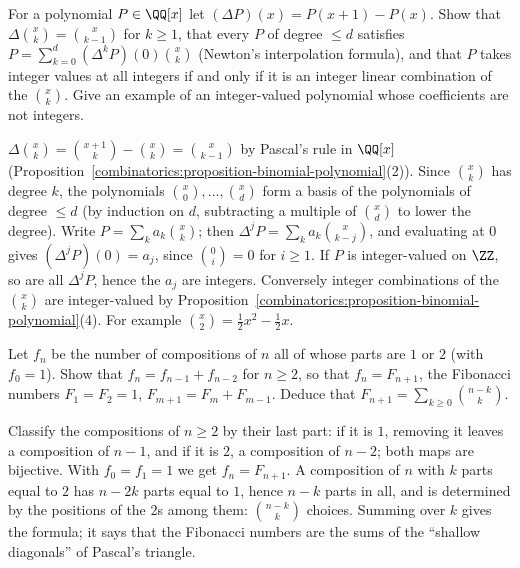 \begin{exercise}\label{combinatorics:exercise-integer-valued}
For a polynomial $P \in \QQ[x]$ let $(\Delta P)(x) = P(x + 1) - P(x)$. Show that $\Delta\binom{x}{k} = \binom{x}{k-1}$ for $k \geq 1$, that every $P$ of degree $\leq d$ satisfies
$P = \sum_{k=0}^{d}(\Delta^kP)(0)\binom{x}{k}$ (Newton's interpolation formula), and that $P$ takes integer values at all integers if and only if it is an integer linear combination of the
$\binom{x}{k}$. Give an example of an integer-valued polynomial whose coefficients are not integers.
\end{exercise}

\begin{solution}
$\Delta\binom{x}{k} = \binom{x+1}{k} - \binom{x}{k} = \binom{x}{k-1}$ by Pascal's rule in $\QQ[x]$ (Proposition~\ref{combinatorics:proposition-binomial-polynomial}(2)). Since $\binom{x}{k}$ has degree
$k$, the polynomials $\binom{x}{0}, \ldots, \binom{x}{d}$ form a basis of the polynomials of degree $\leq d$ (by induction on $d$, subtracting a multiple of $\binom{x}{d}$ to lower the degree). Write
$P = \sum_ka_k\binom{x}{k}$; then $\Delta^jP = \sum_ka_k\binom{x}{k-j}$, and evaluating at $0$ gives $(\Delta^jP)(0) = a_j$, since $\binom{0}{i} = 0$ for $i \geq 1$. If $P$ is integer-valued on
$\ZZ$, so are all $\Delta^jP$, hence the $a_j$ are integers. Conversely integer combinations of the $\binom{x}{k}$ are integer-valued by Proposition~\ref{combinatorics:proposition-binomial-polynomial}(4).
For example $\binom{x}{2} = \frac12x^2 - \frac12x$.
\end{solution}

\begin{exercise}\label{combinatorics:exercise-fibonacci-compositions}
Let $f_n$ be the number of compositions of $n$ all of whose parts are $1$ or $2$ (with $f_0 = 1$). Show that $f_n = f_{n-1} + f_{n-2}$ for $n \geq 2$, so that $f_n = F_{n+1}$, the Fibonacci numbers
$F_1 = F_2 = 1$, $F_{m+1} = F_m + F_{m-1}$. Deduce that $F_{n+1} = \sum_{k \geq 0}\binom{n - k}{k}$.
\end{exercise}

\begin{solution}
Classify the compositions of $n \geq 2$ by their last part: if it is $1$, removing it leaves a composition of $n - 1$, and if it is $2$, a composition of $n - 2$; both maps are bijective. With
$f_0 = f_1 = 1$ we get $f_n = F_{n+1}$. A composition of $n$ with $k$ parts equal to $2$ has $n - 2k$ parts equal to $1$, hence $n - k$ parts in all, and is determined by the positions of the $2$s among
them: $\binom{n-k}{k}$ choices. Summing over $k$ gives the formula; it says that the Fibonacci numbers are the sums of the ``shallow diagonals'' of Pascal's triangle.
\end{solution}

